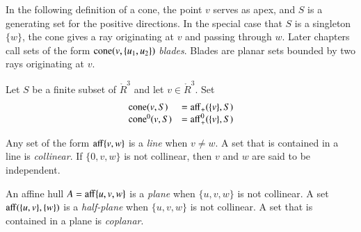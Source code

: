 In the following definition of a cone, the point $v$ serves
as apex, and $S$ is a generating set for the positive directions.
In the special case that $S$ is a singleton $\{w\}$, 
the cone gives
a ray originating at $v$ and passing through $w$.  Later
chapters call sets of the form ${\operatorname{cone}}(v,\{u_1,u_2\})$ {\it blades}.
Blades are planar sets bounded by two rays originating at $v$.
%
%
%

\begin{definition}[cone]
Let $S$ be a finite subset of
$\ring{R}^3$ and let $v\in\ring{R}^3$. Set
  $$\begin{array}{lll}
  {\operatorname{cone}}(v,S) &= {\operatorname{aff}}_+(\{v\},S)\\
  {\operatorname{cone}}^0(v,S) &= {\operatorname{aff}}^0_+(\{v\},S)\\
  \end{array}
  $$
%
%
%
\end{definition}




	
\begin{definition}	
Any set of the form ${\operatorname{aff}}\{v,w\}$ is a {\it line} when $v\ne w$.  A set that is contained in a line is {\it collinear}.  If $\{0,v,w\}$ is not collinear, then $v$ and $w$ are said to be independent.
\end{definition}
%
%

\begin{definition}	
An affine hull $A={\operatorname{aff}}\{u,v,w\}$ is a {\it plane} when $\{u,v,w\}$ is not collinear.   A set ${\operatorname{aff}}(\{u,v\},\{w\})$
is a {\it half-plane} when $\{u,v,w\}$ is not collinear. A set that is contained in a plane is  {\it coplanar}.
\end{definition}
%
%
%
%


